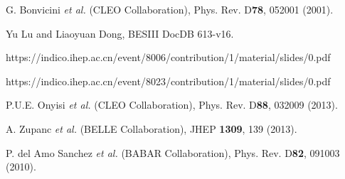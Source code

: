 \begin{thebibliography}{99}
G. Bonvicini {\it et al.}  (CLEO Collaboration),
Phys. Rev. D\textbf{78}, 052001 (2001).

Yu Lu and Liaoyuan Dong, 
BESIII DocDB 613-v16.

https://indico.ihep.ac.cn/event/8006/contribution/1/material/slides/0.pdf

https://indico.ihep.ac.cn/event/8023/contribution/1/material/slides/0.pdf

P.U.E. Onyisi {\it et al.}  (CLEO Collaboration),
Phys. Rev. D\textbf{88}, 032009 (2013).

A. Zupanc {\it et al.}  (BELLE Collaboration),
JHEP \textbf{1309}, 139 (2013).

P. del Amo Sanchez {\it et al.}  (BABAR Collaboration),
Phys. Rev. D\textbf{82}, 091003 (2010).

\end{thebibliography}

